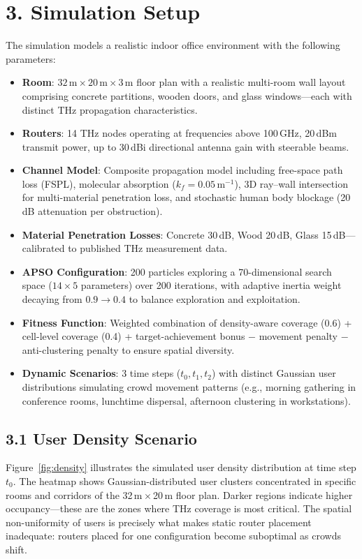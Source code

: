 \documentclass[12pt,a4paper]{article}
\begin{document}
\section{3. Simulation Setup}
The simulation models a realistic indoor office environment with the following parameters:
\begin{itemize}
    \item \textbf{Room}: $32\,\text{m} \times 20\,\text{m} \times 3\,\text{m}$ floor plan with a realistic multi-room wall layout comprising concrete partitions, wooden doors, and glass windows---each with distinct THz propagation characteristics.
    \item \textbf{Routers}: 14 THz nodes operating at frequencies above 100\,GHz, 20\,dBm transmit power, up to 30\,dBi directional antenna gain with steerable beams.
    \item \textbf{Channel Model}: Composite propagation model including free-space path loss (FSPL), molecular absorption ($k_f = 0.05\,\text{m}^{-1}$), 3D ray--wall intersection for multi-material penetration loss, and stochastic human body blockage (20\,dB attenuation per obstruction).
    \item \textbf{Material Penetration Losses}: Concrete 30\,dB, Wood 20\,dB, Glass 15\,dB---calibrated to published THz measurement data.
    \item \textbf{APSO Configuration}: 200 particles exploring a 70-dimensional search space ($14 \times 5$ parameters) over 200 iterations, with adaptive inertia weight decaying from $0.9 \to 0.4$ to balance exploration and exploitation.
    \item \textbf{Fitness Function}: Weighted combination of density-aware coverage (0.6) + cell-level coverage (0.4) + target-achievement bonus $-$ movement penalty $-$ anti-clustering penalty to ensure spatial diversity.
    \item \textbf{Dynamic Scenarios}: 3 time steps ($t_0, t_1, t_2$) with distinct Gaussian user distributions simulating crowd movement patterns (e.g., morning gathering in conference rooms, lunchtime dispersal, afternoon clustering in workstations).
\end{itemize}

\subsection{3.1 User Density Scenario}
Figure~\ref{fig:density} illustrates the simulated user density distribution at time step $t_0$. The heatmap shows Gaussian-distributed user clusters concentrated in specific rooms and corridors of the 32\,m\,$\times$\,20\,m floor plan. Darker regions indicate higher occupancy---these are the zones where THz coverage is most critical. The spatial non-uniformity of users is precisely what makes static router placement inadequate: routers placed for one configuration become suboptimal as crowds shift.
\end{document}
